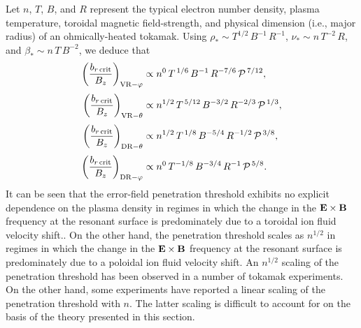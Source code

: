 \documentclass[12pt,prb,aps]{revtex4-1}
\begin{document}
Let $n$, $T$, $B$, and $R$ represent the typical electron number density, plasma temperature, toroidal magnetic field-strength,
and physical dimension (i.e., major radius) of an ohmically-heated tokamak. Using $\rho_\ast\sim T^{1/2}\,B^{-1}\,R^{-1}$, 
$\nu_\ast\sim n\,T^{-2}\,R$, and $\beta_\ast\sim n\,T\,B^{-2}$,
we deduce that
\begin{align}
\left(\frac{b_{r\,{\rm crit}}}{B_z}\right)_{{\rm VR}-\varphi} &\propto n^{0}\,T^{\,1/6}\,B^{-1}\,R^{-7/6}\,{\cal P}^{\,7/12},\\[0.5ex]
\left(\frac{b_{r\,{\rm crit}}}{B_z}\right)_{{\rm VR}-\theta} &\propto n^{1/2}\,T^{\,5/12}\,B^{-3/2}\,R^{-2/3}\,{\cal P}^{\,1/3},\\[0.5ex]
\left(\frac{b_{r\,{\rm crit}}}{B_z}\right)_{{\rm DR}-\theta} &\propto n^{1/2}\,T^{\,1/8}\,B^{-5/4}\,R^{-1/2}\,{\cal P}^{\,3/8},\\[0.5ex]
\left(\frac{b_{r\,{\rm crit}}}{B_z}\right)_{{\rm DR}-\varphi} &\propto n^{0}\,T^{-1/8}\,B^{-3/4}\,R^{-1}\,{\cal P}^{\,5/8}.
\end{align}
It can be seen that the error-field penetration threshold exhibits no explicit dependence on the plasma
density in regimes in which the change in the ${\bf E}\times {\bf B}$ frequency at the resonant surface is predominately due to a toroidal ion fluid 
velocity shift.\cite{rf1998,cole}. On the other hand, the penetration threshold
scales as $n^{1/2}$ in regimes in which the change in the ${\bf E}\times{\bf B}$ frequency at the resonant surface is predominately due to a  poloidal ion fluid velocity shift. An $n^{1/2}$ scaling of the penetration threshold has been observed in a number of tokamak
experiments.\cite{hender,wang1,wang2,lazzaro,park} 
On the other hand, some experiments have reported a linear scaling of the penetration threshold with $n$.\cite{scoville,wolf,wolfe,howell,menard,buttery} The latter
scaling is difficult to account for on the basis of the theory presented in this section. 
\end{document}
